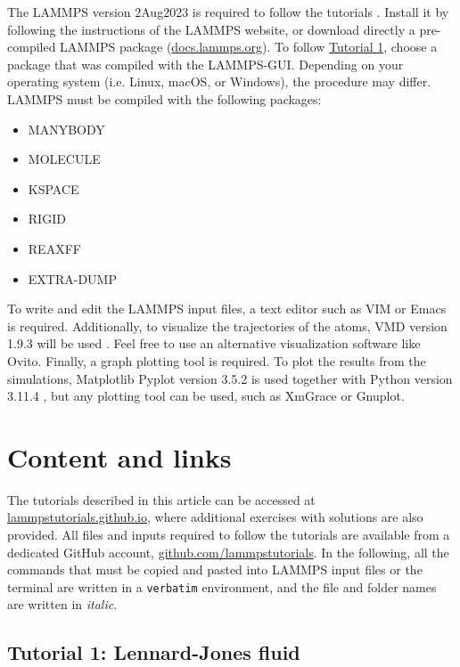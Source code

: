 \documentclass[9pt,tutorial]{livecoms}
\begin{document}
The LAMMPS version 2Aug2023 is required to follow the tutorials \cite{thompson2022lammps}. Install it by following the instructions of the LAMMPS website, or download directly a pre-compiled LAMMPS package (\href{https://docs.lammps.org}{docs.lammps.org}). To follow \hyperref[lennard-jones-label]{Tutorial 1}, choose a package that was compiled with the LAMMPS-GUI. Depending on your operating system (i.e. Linux, macOS, or Windows), the procedure may differ. LAMMPS must be compiled with the following packages:
\begin{itemize}
\item MANYBODY
\item MOLECULE
\item KSPACE
\item RIGID
\item REAXFF
\item EXTRA-DUMP
\end{itemize}
To write and edit the LAMMPS input files, a text editor such as VIM or Emacs is required. Additionally, to visualize the trajectories of the atoms, VMD version 1.9.3 will be used \cite{humphrey1996vmd}. Feel free to use an alternative visualization software like Ovito. Finally, a graph plotting tool is required. To plot the results from the simulations, Matplotlib Pyplot version 3.5.2 is used together with Python version 3.11.4 \cite{van1995python, hunter2007Matplotlib}, but any plotting tool can be used, such as XmGrace or Gnuplot.

\section{Content and links}

The tutorials described in this article can be accessed at \href{https://lammpstutorials.github.io}{lammpstutorials.github.io}, where additional exercises with solutions are also provided. All files and inputs required to follow the tutorials are available from a dedicated GitHub account, \href{https://github.com/lammpstutorials}{github.com/lammpstutorials}. In the following, all the commands that must be copied and pasted into LAMMPS input files or the terminal are written in a  \verb+verbatim+ environment, and the file and folder names are written in \textit{italic}.

\subsection{Tutorial 1: Lennard-Jones fluid}
\label{lennard-jones-label}
\end{document}
